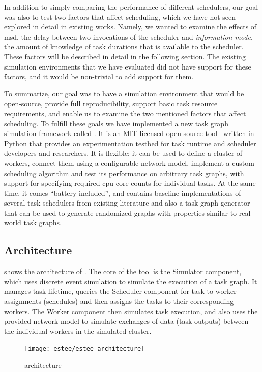In addition to simply comparing the performance of different schedulers, our goal was also to test
two factors that affect scheduling, which we have not seen explored in detail in existing works.
Namely, we wanted to examine the effects of \gls{msd}, the delay between two
invocations of the scheduler and \emph{information mode}, the amount of knowledge of task durations
that is available to the scheduler. These factors will be described in detail in the following
section. The existing simulation environments that we have evaluated did not have support for these
factors, and it would be non-trivial to add support for them.

To summarize, our goal was to have a simulation environment that would be open-source, provide full
reproducibility, support basic task resource requirements, and enable us to examine the two
mentioned factors that affect scheduling. To fulfill these goals we have implemented a new task
graph simulation framework called \estee{}. It is an \mbox{MIT-licensed}
open-source tool~\cite{estee_github} written in Python that provides an experimentation testbed
for task runtime and scheduler developers and researchers. It is flexible; it can be used to define
a cluster of workers, connect them using a configurable network model, implement a custom
scheduling algorithm and test its performance on arbitrary task graphs, with support for specifying
required \gls{cpu} core counts for individual tasks. At the same time, it comes
``battery-included'', and contains baseline implementations of several task schedulers from
existing literature and also a task graph generator that can be used to generate randomized graphs
with properties similar to real-world task graphs.

\subsection{Architecture}
 shows the architecture of \estee{}. The core of the
tool is the Simulator component, which uses discrete event simulation to simulate the execution of
a task graph. It manages task lifetime, queries the Scheduler component for task-to-worker
assignments (schedules) and then assigns the tasks to their corresponding workers. The Worker
component then simulates task execution, and also uses the provided network model to simulate
exchanges of data (task outputs) between the individual workers in the simulated cluster.

\begin{figure}
	\centering
	\texttt{[image: estee/estee-architecture]}
	\caption{\estee{} architecture}
	\label{fig:estee-architecture}
\end{figure}

